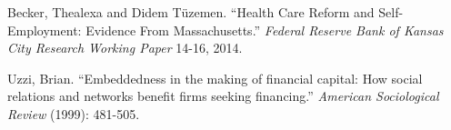 \documentclass[12pt]{article}
\begin{document}
\begin{thebibliography}{99}
\begin{comment}

http://dish.andrewsullivan.com/2014/04/16/obamas-meep-meep-on-health-care


\bibitem{businessweek}
Symonds, William C. ``In Massachusetts, Health Care for All?'' Bloomberg Business Week. Bloomberg, 03 Apr. 2006. Web. 26 Jan. 2015.

\bibitem{wooldridgeBook}
Wooldridge, J. M.  2002.  Econometric Analysis of Cross Section and Panel Data.  Cambridge, MA: MIT Press.

\bibitem{census}
http://www.census.gov/prod/2008pubs/p60-235.pdf

Insured if covered by any kind of health insurance for all or part of the previous year

\bibitem{globe}
http://managinghealthcarecosts.blogspot.com/2011/06/romneycare-works.html
2008 drop in uninsured and spike in costs

\bibitem{chia}
Asks if they currently have health insurance. 2008, summer, other years spring


\bibitem{individual}
https://www.power2u.org/downloads/Mass-health-care-reform-2011.pdf
Individual plan enrollment grew between 2006 and 2008

\bibitem{summers}
Mandated Benefit Incidence (Summers, 1989)


\end{comment}

Becker, Thealexa and Didem T\"{u}zemen. ``Health Care Reform and Self-Employment: Evidence From Massachusetts.'' \emph{Federal Reserve Bank of Kansas City Research Working Paper} 14-16, 2014.

Uzzi, Brian. ``Embeddedness in the making of financial capital: How social relations and networks benefit firms seeking financing.'' \emph{American Sociological Review} (1999): 481-505.

\end{thebibliography}
\end{document}
